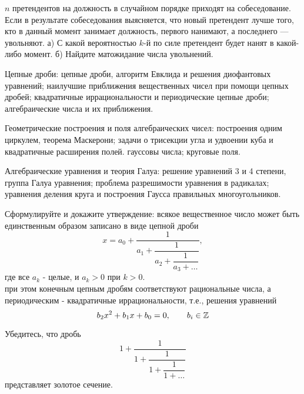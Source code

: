 \documentclass[a4paper,12pt]{article}
\begin{document}
$n$ претендентов на должность в случайном порядке приходят на собеседование. Если в
результате собеседования выясняется, что новый претендент лучше того, кто в данный момент занимает
должность, первого нанимают, а последнего — увольняют. а) С какой вероятностью $k$-й по силе
претендент будет нанят в какой-либо момент. б) Найдите матожидание числа увольнений.


















\newpage
{}

\begin{nums}{-2}
\item Цепные дроби: цепные дроби, алгоритм Евклида и решения диофантовых уравнений;
 наилучшие приближения вещественных чисел при помощи цепных дробей; квадратичные
 иррациональности и периодические цепные дроби;  алгебраические числа и их приближения.
\item Геометрические построения и  поля алгебраических чисел: построения одним циркулем, теорема Маскерони; задачи о трисекции угла и удвоении куба и квадратичные расширения полей.
гауссовы числа; круговые поля.
\item Алгебраические уравнения  и теория Галуа: решение уравнений 3 и 4 степени, группа Галуа
 уравнения; проблема разрешимости уравнения в радикалах;
 уравнения деления круга и построения Гаусса правильных многоугольников.
\end{nums}


 Сформулируйте и докажите утверждение: всякое вещественное число может быть
единственным образом записано в виде цепной дроби
$$x=a_0+\dfrac{1}{a_1+\dfrac{1}{a_2+\dfrac{1}{a_3+\ldots}}},$$
где все $a_k$ - целые, и $a_k>0$ при $k>0$.
\\
 при этом конечным цепным дробям соответствуют рациональные числа, а периодическим -  квадратичные иррациональности, т.е., решения уравнений  $$b_2x^2+b_1x+b_0=0, \qquad b_i\in\mathbb{Z}$$

 Убедитесь, что дробь
 $$1+\dfrac{1}{1+\dfrac{1}{1+\dfrac{1}{1+\ldots}}}$$
 представляет золотое сечение.
\end{document}
